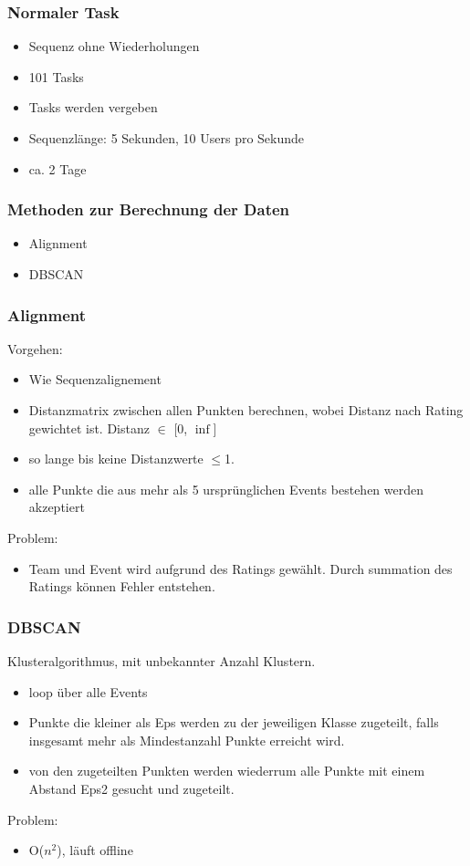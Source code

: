 \documentclass[]{beamer}
\begin{document}
\begin{frame}
	\frametitle{Normaler Task}
	\begin{itemize}
		\item Sequenz ohne Wiederholungen
		\item 101 Tasks
		\item Tasks werden vergeben
		\item Sequenzlänge: 5 Sekunden, 10 Users pro Sekunde
		\item ca. 2 Tage
	\end{itemize}
\end{frame}

\begin{frame}
	\frametitle{Methoden zur Berechnung der Daten}
	\begin{itemize}
		\item Alignment
		\item DBSCAN
	\end{itemize}
\end{frame}

\begin{frame}
	\frametitle{Alignment}
	Vorgehen:
	\begin{itemize}
		\item Wie Sequenzalignement
		\item Distanzmatrix zwischen allen Punkten berechnen, wobei Distanz nach Rating gewichtet ist. Distanz $\in$ [0, $\inf$]
		\item so lange bis keine Distanzwerte $\le$1.
		\item alle Punkte die aus mehr als 5 ursprünglichen Events bestehen werden akzeptiert
	\end{itemize}
	Problem:
	\begin{itemize}
		\item Team und Event wird aufgrund des Ratings gewählt. Durch summation des Ratings können Fehler entstehen.
	\end{itemize}
\end{frame}

\begin{frame}
	\frametitle{DBSCAN}
	Klusteralgorithmus, mit unbekannter Anzahl Klustern.
	\begin{itemize}
		\item loop über alle Events
		\item Punkte die kleiner als Eps werden zu der jeweiligen Klasse zugeteilt, falls insgesamt mehr als Mindestanzahl Punkte erreicht wird.
		\item von den zugeteilten Punkten werden wiederrum alle Punkte mit einem Abstand Eps2 gesucht und zugeteilt.
	\end{itemize}
	Problem:
	\begin{itemize}
		\item O($n^2$), läuft offline
	\end{itemize}
\end{frame}
\end{document}
